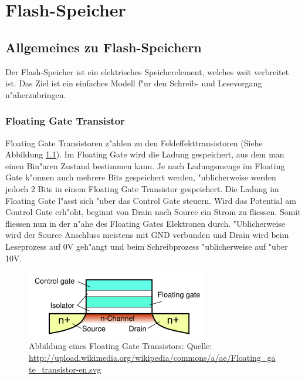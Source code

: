 \chapter{Flash-Speicher\label{chapter:flash}}
\begin{refsection}

\section{Allgemeines zu Flash-Speichern}
Der Flash-Speicher ist ein elektrisches Speicherelement, welches
weit verbreitet ist.
Das Ziel ist ein einfaches Modell f"ur den Schreib- und Lesevorgang
n"aherzubringen.

\subsection{Floating Gate Transistor}
Floating Gate Transistoren z"ahlen zu den Feldeffekttransistoren
(Siehe Abbildung \ref{skript:Floatinggatetransistor}).
Im Floating Gate wird die Ladung gespeichert, aus dem man einen Bin"aren
Zustand bestimmen kann.
Je nach Ladungsmenge im Floating Gate k"onnen auch mehrere Bits gespeichert
werden, "ublicherweise werden jedoch 2 Bits in einem Floating Gate
Transistor gespeichert.
Die Ladung im Floating Gate l"asst sich "uber das Control Gate steuern.
Wird das Potential am Control Gate erh"oht, beginnt von Drain nach
Source ein Strom zu fliessen.
Somit fliessen nun in der n"ahe des Floating Gates Elektronen durch.
"Ublicherweise wird der Source Anschluss meistens mit GND verbunden und
Drain wird beim Leseprozess auf 0V geh"angt und beim Schreibprozess
"ublicherweise auf "uber 10V.

\begin{figure}
\centering
\includegraphics[width=0.7\textwidth]{flash/graphics/Floatinggate.pdf}
\caption{Abbildung eines Floating Gate Transistors: Quelle:
\url{http://upload.wikimedia.org/wikipedia/commons/a/ae/Floating_gate_transistor-en.svg}
\label{skript:Floatinggatetransistor}}
\end{figure}


\end{refsection}
